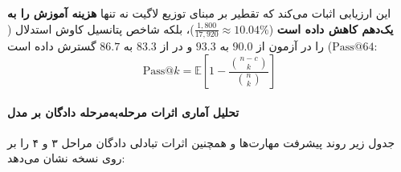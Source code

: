 \begin{table}[htbp]
\centering
\caption{مقایسه اثربخشی دادگان تقطیر درون‌پالیسی در برابر یادگیری تقویتی روی مدل }
\label{tab:qwen3_distillation_vs_rl}
\end{table}

این ارزیابی اثبات می‌کند که تقطیر بر مبنای توزیع لاگیت نه تنها \textbf{هزینه آموزش را به یک‌دهم کاهش داده است} ($\frac{1,800}{17,920} \approx 10.04\%$)، بلکه شاخص پتانسیل کاوش استدلال ($\text{Pass}@64$) را در آزمون  از $90.0$ به $93.3$ و در  از $83.3$ به $86.7$ گسترش داده است:
\begin{equation}
    \text{Pass}@k = \mathbb{E} \left[ 1 - \frac{\binom{n - c}{k}}{\binom{n}{k}} \right]
\end{equation}

\paragraph*{تحلیل آماری اثرات مرحله‌به‌مرحله دادگان بر مدل }
جدول زیر روند پیشرفت مهارت‌ها و همچنین اثرات تبادلی دادگان مراحل ۳ و ۴ را بر روی نسخه  نشان می‌دهد:

